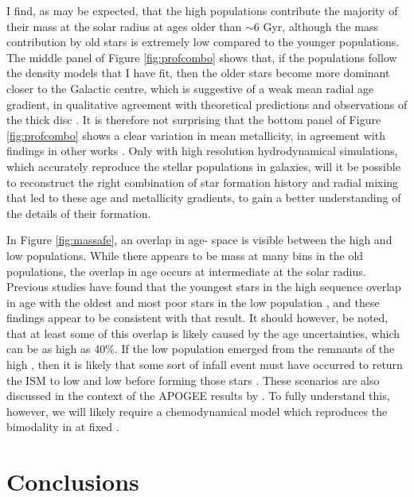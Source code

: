 I find, as may be expected, that the high \afe{} populations contribute the majority of their mass at the solar radius at ages older than $\sim 6$ Gyr, although the mass contribution by old stars is extremely low compared to the younger populations. The middle panel of Figure \ref{fig:profcombo} shows that, if the populations follow the density models that I have fit, then the older stars become more dominant closer to the Galactic centre, which is suggestive of a weak mean radial age gradient, in qualitative agreement with theoretical predictions \citep[e.g.][]{2015ApJ...804L...9M} and observations of the thick disc \citep[e.g.][]{2016arXiv160901168M}. It is therefore not surprising that the bottom panel of Figure \ref{fig:profcombo} shows a clear variation in mean metallicity, in agreement with findings in other works \citep[e.g.][]{2012ApJ...746..149C,2016arXiv160804951A,2015ApJ...808..132H}. Only with high resolution hydrodynamical simulations, which accurately reproduce the stellar populations in galaxies, will it be possible to reconstruct the right combination of star formation history and radial mixing that led to these age and metallicity gradients, to gain a better understanding of the details of their formation.

In Figure \ref{fig:massafe}, an overlap in age-\feh{} space is visible between the high and low \afe{} populations. While there appears to be mass at many \feh{} bins in the old populations, the overlap in age occurs at intermediate \feh{} at the solar radius. Previous studies have found that the youngest stars in the high \afe{} sequence overlap in age with the oldest and most \feh{} poor stars in the low \afe{} population \citep[e.g.][]{2013A&A...560A.109H}, and these findings appear to be consistent with that result. It should however, be noted, that at least some of this overlap is likely caused by the age uncertainties, which can be as high as 40\%. If the low \afe{} population emerged from the remnants of the high \afe{}, then it is likely that some sort of infall event must have occurred to return the ISM to low \feh{} and low \afe{} before forming those stars \citep[as expressed by, e.g.,][]{1997ApJ...477..765C}. These scenarios are also discussed in the context of the APOGEE results by \citet{2014ApJ...796...38N}. To fully understand this, however, we will likely require a chemodynamical model which reproduces the bimodality in \afe{} at fixed \feh{}.

\section{Conclusions}
\label{sec:conclusionsa}

